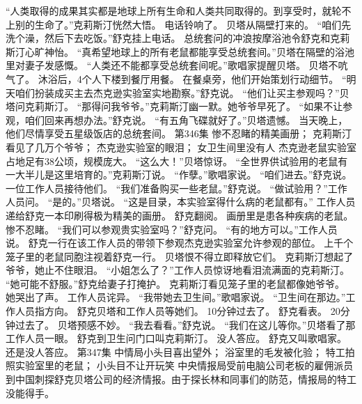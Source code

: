 \documentclass[a4paper,12pt,UTF8,twoside]{ctexbook}
\begin{document}
        “人类取得的成果其实都是地球上所有生命和人类共同取得的。到享受时，就轮不上别的生命了。”克莉斯汀恍然大悟。  
        电话铃响了。  
        贝塔从隔壁打来的。  
        “咱们先洗个澡，然后下去吃饭。”舒克挂上电话。  
        总统套问的冲浪按摩浴池令舒克和克莉斯汀心旷神怡。  
        “真希望地球上的所有老鼠都能享受总统套间。”贝塔在隔壁的浴池里对妻子发感慨。  
        “人类还不能都享受总统套间呢。”歌唱家提醒贝塔。  
        贝塔不吭气了。  
        沐浴后，4个人下楼到餐厅用餐。  
        在餐桌旁，他们开始策划行动细节。  
        “明天咱们扮装成买主去杰克逊实验室实地勘察。”舒克说。  
        “他们让买主参观吗？”贝塔问克莉斯汀。  
        “那得问我爷爷。”克莉斯汀幽一默。她爷爷早死了。  
        “如果不让参观，咱们回来再想办法。”舒克说。  
        “有五角飞碟就好了。”贝塔遗憾。  
        当天晚上，他们尽情享受五星级饭店的总统套间。          第346集  
        惨不忍睹的精美画册；  
        克莉斯汀看见了几万个爷爷；  
        杰克逊实验室的眼泪；  
        女卫生间里没有人    
        杰克逊老鼠实验室占地足有38公顷，规模庞大。  
        “这么大！”贝塔惊讶。  
        “全世界供试验用的老鼠有一大半儿是这里培育的。”克莉斯汀说。  
        “作孽。”歌唱家说。  
        “咱们进去。”舒克说。  
        一位工作人员接待他们。  
        “我们准备购买一些老鼠。”舒克说。  
        “做试验用？”工作人员问。  
        “是的。”贝塔说。  
        “这是目录，本实验室得什么病的老鼠都有。” 工作人员递给舒克一本印刷得极为精美的画册。  
        舒克翻阅。  
        画册里是患各种疾病的老鼠。惨不忍睹。  
        “我们可以参观贵实验室吗？”舒克问。  
        “有的地方可以。”工作人员说。  
        舒克一行在该工作人员的带领下参观杰克逊实验室允许参观的部位。  
        上千个笼子里的老鼠同胞注视着舒克一行。  
        贝塔恨不得立即释放它们。  
        克莉斯汀想起了爷爷，她止不住眼泪。  
        “小姐怎么了？”工作人员惊讶地看泪流满面的克莉斯汀。  
        “她可能不舒服。”舒克给妻子打掩护。  
        克莉斯汀看见笼子里的老鼠都像她爷爷。  
        她哭出了声。  
        工作人员诧异。  
        “我带她去卫生间。”歌唱家说。  
        “卫生间在那边。”工作人员指方向。  
        舒克贝塔和工作人员等她们。  
        10分钟过去了。  
        舒克看表。  
        20分钟过去了。  
        贝塔预感不妙。  
        “我去看看。”舒克说。        
        “我们在这儿等你。”贝塔看了那工作人员一眼。  
        舒克到卫生问门口叫克莉斯汀。  
        没人答应。  
        舒克又叫歌唱家。  
        还是没人答应。          第347集  
        中情局小头目喜出望外；  
        浴室里的毛发被化验；  
        特工拍照实验室里的老鼠；  
        小头目不让开玩笑    
        中央情报局受前电脑公司老板的雇佣派员到中国刺探舒克贝塔公司的经济情报。由于探长林和同事们的防范，情报局的特工没能得手。  
\end{document}

